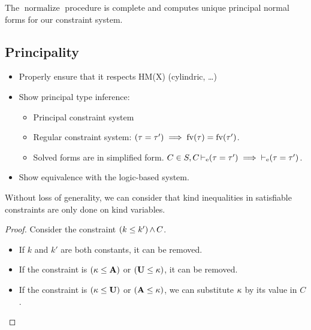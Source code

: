 \begin{theorem}
  The $\operatorname{normalize}$ procedure is complete and computes
  unique principal normal forms for our constraint system.
\end{theorem}


\subsection{Principality}

\TODO{}

\begin{itemize}
\item Properly ensure that it respects HM(X) (cylindric, \dots)
\item Show principal type inference:
  \begin{itemize}
  \item Principal constraint system
  \item Regular constraint system: $(\tau = \tau') \implies \operatorname{fv}(\tau) = \operatorname{fv}(\tau')$.
  \item Solved forms are in simplified form.
    $C\in S, C \operatorname{\vdash_e} (\tau = \tau') \implies \operatorname{\vdash_e} (\tau = \tau')$.
  \end{itemize}
\item Show equivalence with the logic-based system.

\end{itemize}


\begin{lemma}
  Without loss of generality, we can consider that
  kind inequalities in satisfiable constraints
  are only done on kind variables. 

  \begin{proof}
    Consider the constraint $(k \leq k')\operatorname{\wedge} C$.
    \begin{itemize}
    \item If $k$ and $k'$ are both constants, it can be removed.
    \item If the constraint is $(\kappa \leq \mathbf{A})$ or $(\mathbf{U} \leq \kappa)$, it can be removed.
    \item If the constraint is $(\kappa \leq \mathbf{U})$ or $(\mathbf{A} \leq \kappa)$, we
      can substitute $\kappa$ by its value in $C$.
    \end{itemize}
  \end{proof}
\end{lemma}

